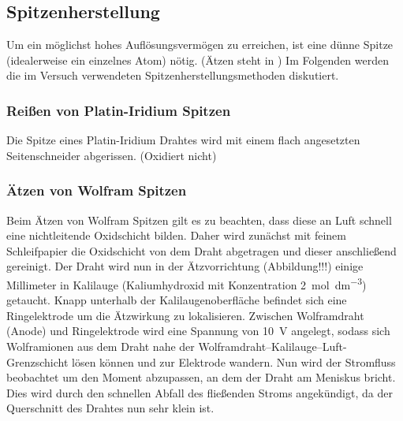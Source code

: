 \documentclass[10pt, a4paper]{article}
\begin{document}
\subsection{Spitzenherstellung}
Um ein möglichst hohes Auflösungsvermögen zu erreichen, ist eine dünne Spitze (idealerweise ein einzelnes Atom) nötig. (Ätzen steht in \cite{colton})
Im Folgenden werden die im Versuch verwendeten Spitzenherstellungsmethoden diskutiert.

\subsubsection{Reißen von Platin-Iridium Spitzen}
Die Spitze eines Platin-Iridium Drahtes wird mit einem flach angesetzten Seitenschneider abgerissen. (Oxidiert nicht)

\subsubsection{Ätzen von Wolfram Spitzen}
Beim Ätzen von Wolfram Spitzen gilt es zu beachten, dass diese an Luft schnell eine nichtleitende Oxidschicht bilden.
Daher wird zunächst mit feinem Schleifpapier die Oxidschicht von dem Draht abgetragen und dieser anschließend gereinigt.
Der Draht wird nun in der Ätzvorrichtung (Abbildung!!!) einige Millimeter in Kalilauge (Kaliumhydroxid mit Konzentration \SI{2}{\mol\per\cubic\deci\metre}) getaucht.
Knapp unterhalb der Kalilaugenoberfläche befindet sich eine Ringelektrode um die Ätzwirkung zu lokalisieren.
Zwischen Wolframdraht (Anode) und Ringelektrode wird eine Spannung von \SI{10}{\volt} angelegt, sodass sich Wolframionen aus dem Draht nahe der Wolframdraht--Kalilauge--Luft-Grenzschicht lösen können und zur Elektrode wandern.
Nun wird der Stromfluss beobachtet um den Moment abzupassen, an dem der Draht am Meniskus bricht.
Dies wird durch den schnellen Abfall des fließenden Stroms angekündigt, da der Querschnitt des Drahtes nun sehr klein ist.
\end{document}
